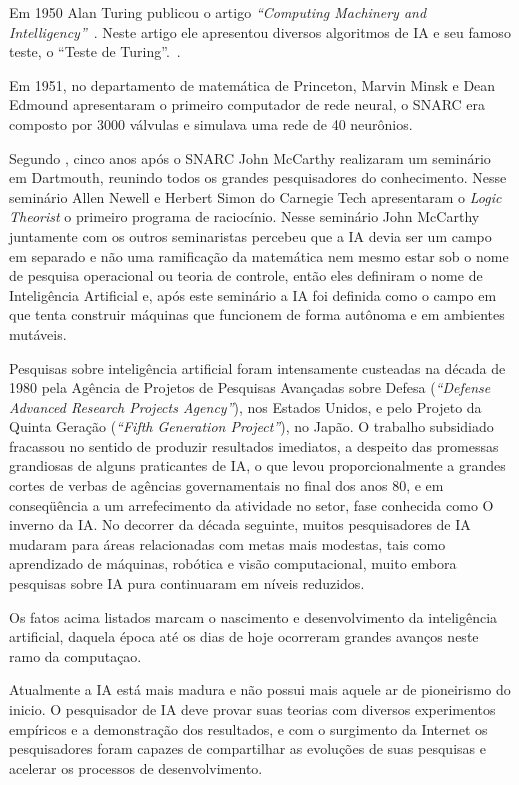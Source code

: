Em 1950 Alan Turing publicou o artigo \textit{``Computing Machinery and Intelligency''}~\cite{artigo_turing}. Neste artigo ele apresentou diversos algoritmos de IA e seu famoso teste, o ``Teste de Turing''.~\cite{livro_russel}.

Em 1951, no departamento de matemática de Princeton, Marvin Minsk e Dean Edmound apresentaram o primeiro computador de rede
neural, o SNARC era composto por 3000 válvulas e simulava uma rede de 40 neurônios.~\cite{livro_russel}

Segundo \cite{livro_russel}, cinco anos após o SNARC John McCarthy realizaram um seminário em Dartmouth, reunindo todos os grandes pesquisadores do conhecimento. Nesse seminário Allen Newell e Herbert Simon do Carnegie Tech apresentaram o \textit{Logic Theorist} o primeiro programa de raciocínio. Nesse seminário John McCarthy juntamente com os outros seminaristas percebeu que a IA devia ser um campo em separado e não uma ramificação da matemática nem mesmo estar sob o nome de pesquisa operacional ou teoria de controle, então eles definiram o nome de Inteligência Artificial e, após este seminário a IA foi definida como o campo em que tenta construir máquinas que funcionem de forma autônoma e em ambientes mutáveis.


Pesquisas sobre inteligência artificial foram intensamente custeadas na década de 1980 pela Agência de Projetos de Pesquisas Avançadas sobre Defesa (\textit{“Defense Advanced Research Projects Agency”}), nos Estados Unidos, e pelo Projeto da Quinta Geração (\textit{“Fifth Generation Project”}), no Japão. O trabalho subsidiado fracassou no sentido de produzir resultados imediatos, a despeito das promessas grandiosas de alguns praticantes de IA, o que levou proporcionalmente a grandes cortes de verbas de agências governamentais no final dos anos 80, e em conseqüência a um arrefecimento da atividade no setor, fase conhecida como O inverno da IA. No decorrer da década seguinte, muitos pesquisadores de IA mudaram para áreas relacionadas com metas mais modestas, tais como aprendizado de máquinas, robótica e visão computacional, muito embora pesquisas sobre IA pura continuaram em níveis reduzidos.

Os fatos acima listados marcam o nascimento e desenvolvimento da inteligência artificial, daquela época até os dias de hoje ocorreram grandes avanços neste ramo da computaçao. 

Atualmente a IA está mais madura e não possui mais aquele ar de pioneirismo do inicio. O pesquisador de IA deve provar suas teorias com diversos experimentos empíricos e a demonstração dos resultados, e com o surgimento da Internet os pesquisadores foram capazes de compartilhar as evoluções de suas pesquisas e acelerar os processos de desenvolvimento.

